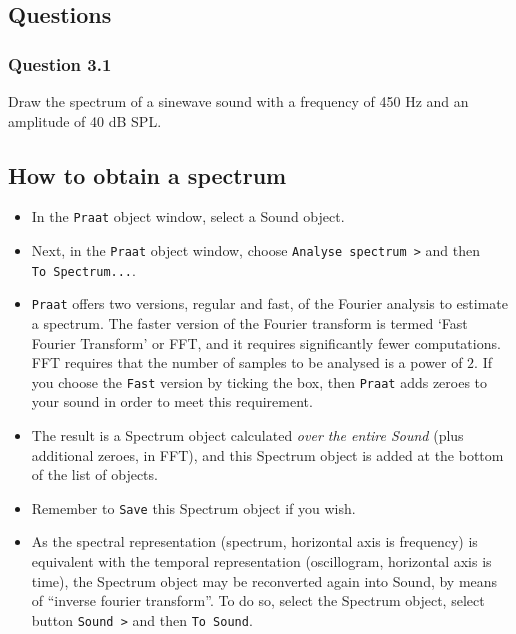 \documentclass[
]{book}
\begin{document}
\label{questions-spectrum}
\subsection*{Questions}\label{questions-2}

\subsubsection*{Question 3.1}\label{question-3.1}

Draw the spectrum of a sinewave sound with a frequency of 450 Hz and an amplitude of 40 dB SPL.

\label{box-praatspectrum}
\subsection{How to obtain a spectrum}\label{how-to-obtain-a-spectrum}

\begin{itemize}
\item
  In the \texttt{Praat} object window, select a Sound object.
\item
  Next, in the \texttt{Praat} object window, choose \texttt{Analyse\ spectrum\ \textgreater{}} and then \texttt{To\ Spectrum...}.
\item
  \texttt{Praat} offers two versions, regular and fast, of the Fourier analysis to estimate a spectrum. The faster version of the Fourier transform is termed `Fast Fourier Transform' or FFT, and it requires significantly fewer computations. FFT requires that the number of samples to be analysed is a power of \(2\). If you choose the \texttt{Fast} version by ticking the box, then \texttt{Praat} adds zeroes to your sound in order to meet this requirement.
\item
  The result is a Spectrum object calculated \emph{over the entire Sound} (plus additional zeroes, in FFT), and this Spectrum object is added at the bottom of the list of objects.
\item
  Remember to \texttt{Save} this Spectrum object if you wish.
\item
  As the spectral representation (spectrum, horizontal axis is frequency) is equivalent with the temporal representation (oscillogram, horizontal axis is time), the Spectrum object may be reconverted again into Sound, by means of ``inverse fourier transform''.
  To do so, select the Spectrum object, select button \texttt{Sound\ \textgreater{}} and then \texttt{To\ Sound}.
\end{itemize}
\end{document}

